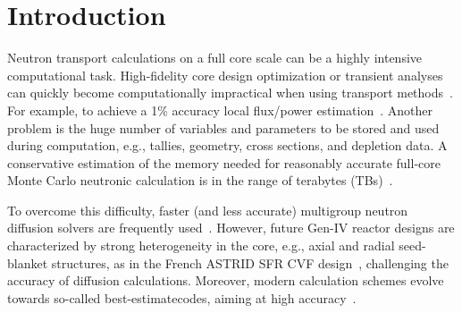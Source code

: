 %
\maketitle
%
\section{Introduction}
\label{sec:intro}

Neutron transport calculations on a full core scale can be a highly intensive computational task. High-fidelity core design optimization or transient analyses can quickly become computationally impractical when using transport methods~\cite{Kim-2019}. For example, \DIFdelbegin {}\DIFdelend \DIFaddbegin {}\DIFaddend to achieve a 1\% accuracy \DIFdelbegin {}\DIFdelend \DIFaddbegin {}\DIFaddend local flux/power estimation\DIFdelbegin {}\DIFdelend ~\cite{Martin-2012}. Another problem is the huge number of variables and parameters to be stored and used during computation, e.g., tallies, geometry, cross sections, and depletion data. A conservative estimation of the memory needed for reasonably accurate full-core Monte Carlo neutronic calculation is in the range of terabytes (TBs)~\cite{Martin-2012}. \DIFaddbegin {}\DIFaddend 

\DIFdelbegin %

\DIFdelend To overcome this difficulty, faster (and less accurate) multigroup neutron diffusion solvers are frequently used~\cite{Lawrence-1986,Smith-1986}. However, future Gen-IV reactor designs are characterized by strong heterogeneity in the core, e.g., axial and radial seed-blanket structures, as in the French ASTRID SFR CVF design~\cite{Bertrand-2016}, challenging the accuracy of diffusion calculations. Moreover, modern calculation schemes evolve towards so-called \DIFdelbegin {}\DIFdelend \DIFaddbegin {}\DIFaddend best-estimate\DIFdelbegin {}\DIFdelend \DIFaddbegin {}\DIFaddend codes, aiming at high accuracy~\cite{IAEA-BE-2008}. 

